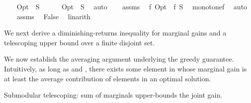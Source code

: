 \begin{isabellebody}
%
\isadelimproof
%
\endisadelimproof
%
\isatagproof
{}\isamarkupfalse%
\isanewline
\ \ \isamarkupfalse%
\ {\isachardoublequoteopen}Opt\ {\isacharminus}{\kern0pt}\ S\ {\isacharequal}{\kern0pt}\ {\isacharbraceleft}{\kern0pt}{\isacharbraceright}{\kern0pt}{\isachardoublequoteclose}\isanewline
\ \ \isamarkupfalse%
\ {\isachardoublequoteopen}Opt\ {\isasymsubseteq}\ S{\isachardoublequoteclose}\ \isamarkupfalse%
\ auto\isanewline
\ \ \isamarkupfalse%
\ assms{\isacharparenleft}{\kern0pt}{}{\isacharcomma}{\kern0pt}{}{\isacharparenright}{\kern0pt}\ \isamarkupfalse%
\ {\isachardoublequoteopen}f\ Opt\ {\isasymle}\ f\ S{\isachardoublequoteclose}\ \isamarkupfalse%
\ monotone{\isacharunderscore}{\kern0pt}f\ \isamarkupfalse%
\ auto\isanewline
\ \ \isamarkupfalse%
\ assms{\isacharparenleft}{\kern0pt}{}{\isacharparenright}{\kern0pt}\ \isamarkupfalse%
\ False\ \isamarkupfalse%
\ linarith\isanewline
{}\isamarkupfalse%
%
\endisatagproof
{\isafoldproof}%
%
\isadelimproof
%
\endisadelimproof
%
\isadelimdocument
%
\endisadelimdocument
%
\isatagdocument
%
\isamarkuptrue%
%
\endisatagdocument
{\isafolddocument}%
%
\isadelimdocument
%
\endisadelimdocument
%
\begin{isamarkuptext}%
We next derive a diminishing-returns inequality for marginal gains and
  a telescoping upper bound over a finite disjoint set.%
\end{isamarkuptext}\isamarkuptrue%
%
\isadelimdocument
%
\endisadelimdocument
%
\isatagdocument
%
\isamarkuptrue%
%
\endisatagdocument
{\isafolddocument}%
%
\isadelimdocument
%
\endisadelimdocument
%
\begin{isamarkuptext}%
We now establish the averaging argument underlying the greedy guarantee.
  Intuitively, as long as  and , there exists
  some element in  whose marginal gain is at least the average
  contribution of elements in an optimal solution.%
\end{isamarkuptext}\isamarkuptrue%
%
\begin{isamarkuptext}%
Submodular telescoping: sum of marginals upper-bounds the joint gain.%

\end{isamarkuptext}
\end{isabellebody}
